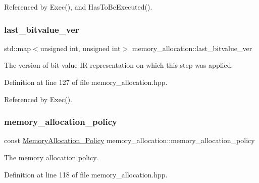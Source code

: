 Referenced by Exec(), and Has\+To\+Be\+Executed().

\mbox{\label{classmemory__allocation_a1838e262151b179c199161437b482c97}} 
\subsubsection{\texorpdfstring{last\+\_\+bitvalue\+\_\+ver}{last\_bitvalue\_ver}}
{\footnotesize\ttfamily std\+::map$<$unsigned int, unsigned int$>$ memory\+\_\+allocation\+::last\+\_\+bitvalue\+\_\+ver\hspace{0.3cm}{\ttfamily [protected]}}



The version of bit value IR representation on which this step was applied. 



Definition at line 127 of file memory\+\_\+allocation.\+hpp.



Referenced by Exec().

\mbox{\label{classmemory__allocation_a42529c8d173922759948b7c4da5651ac}} 
\subsubsection{\texorpdfstring{memory\+\_\+allocation\+\_\+policy}{memory\_allocation\_policy}}
{\footnotesize\ttfamily const \hyperlink{memory__allocation_8hpp_aad85c6dac5893e8093336373dd19539b}{Memory\+Allocation\+\_\+\+Policy} memory\+\_\+allocation\+::memory\+\_\+allocation\+\_\+policy\hspace{0.3cm}{\ttfamily [protected]}}



The memory allocation policy. 



Definition at line 118 of file memory\+\_\+allocation.\+hpp.



